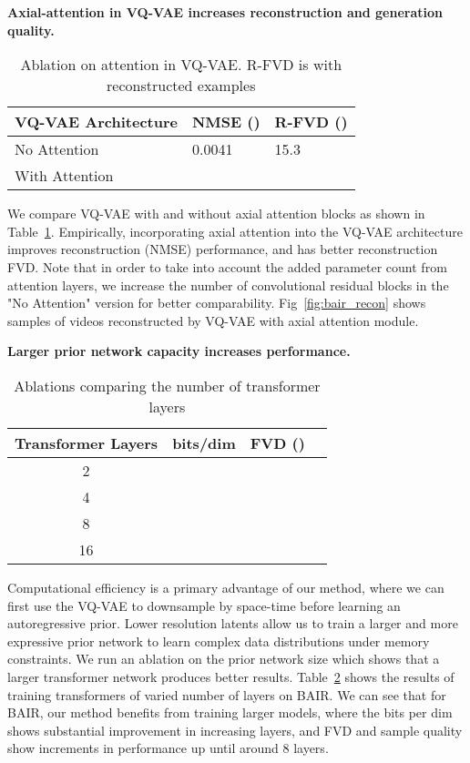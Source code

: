 \documentclass{article}
\begin{document}
\textbf{Axial-attention in VQ-VAE increases reconstruction and generation quality.}
\begin{table}[H]
    \begin{minipage}{.5\textwidth}
        \centering

        \caption{Ablation on attention in VQ-VAE. R-FVD is with reconstructed examples}
        \label{table:abl_vqvae_attn}
        \begin{tabular}{@{}lll@{}}
            \toprule
            VQ-VAE Architecture & NMSE ()       & R-FVD ()   \\ \midrule
            No Attention        & 0.0041      & 15.3  \\
            With Attention      &  &  \\ \bottomrule
        \end{tabular}
    \end{minipage}
\end{table}
We compare VQ-VAE with and without axial attention blocks as shown in Table~\ref{table:abl_vqvae_attn}. Empirically, incorporating axial attention into the VQ-VAE architecture improves reconstruction (NMSE) performance, and has better reconstruction FVD. Note that in order to take into account the added parameter count from attention layers, we increase the number of convolutional residual blocks in the "No Attention" version for better comparability. Fig~\ref{fig:bair_recon} shows samples of videos reconstructed by VQ-VAE with axial attention module. 

\textbf{Larger prior network capacity increases performance.}
\begin{table}[H]
        \centering
        \caption{Ablations comparing the number of transformer layers}
\label{table:abl_tfm_layers}
\begin{tabular}{@{}cccc@{}}
\toprule
Transformer Layers & bits/dim & FVD ()  \\ \midrule
2                  &    &       \\
4                  &    &        \\
8                  &    &        \\
16                 &    &        \\ \bottomrule
\end{tabular}
\end{table}
Computational efficiency is a primary advantage of our method, where we can first use the VQ-VAE to downsample by space-time before learning an autoregressive prior. Lower resolution latents allow us to train a larger and more expressive prior network to learn complex data distributions under memory constraints. We run an ablation on the prior network size which shows that a larger transformer network produces better results. Table~\ref{table:abl_tfm_layers} shows the results of training transformers of varied number of layers on BAIR. We can see that for BAIR, our method benefits from training larger models, where the bits per dim shows substantial improvement in increasing layers, and FVD and sample quality show increments in performance up until around 8 layers. 
\end{document}
